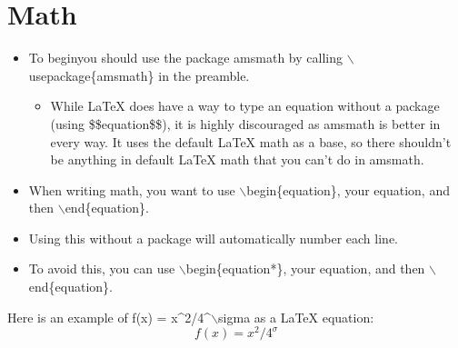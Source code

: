 \documentclass{article}
\begin{document}
	\section{Math}
		\begin{itemize}
			\item To beginyou should use the  package amsmath by calling $\backslash$usepackage\{amsmath\} in the preamble.
			\begin{itemize}
				\item While \LaTeX{} does have a way to type an equation without a package (using \$\$equation\$\$), it is highly discouraged as amsmath is better in every way. It uses the default \LaTeX{} math as a base, so there shouldn\rq{}t be anything in default \LaTeX{} math that you can\rq{}t do in amsmath.
			\end{itemize}
			\item When writing math, you want to use $\backslash$begin\{equation\}, your equation, and then $\backslash$end\{equation\}.
			\item Using this without a package will automatically number each line.
			\item To avoid this, you can use $\backslash$begin\{equation*\}, your equation, and then $\backslash$end\{equation\}.
		\end{itemize}
		
		Here is an example of f(x) = x\string^2/4\string^$\backslash$sigma as a \LaTeX{} equation:
		\\
		\begin{equation}
			f(x) = x^2/4^\sigma
		\end{equation}
\end{document}
